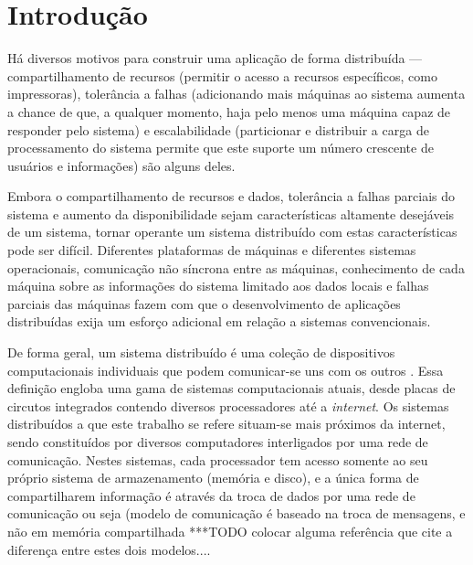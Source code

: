 \documentclass[11pt,twoside,a4paper]{book}
\begin{document}
\listoffigures
\listoftables
\listofalgorithms

\mainmatter

\fancyhead[RE,LO]{\thesection}

\singlespacing              %

\chapter{Introdução}
\label{chap:introducao}
Há diversos motivos para construir uma aplicação de forma distribuída --- compartilhamento de recursos (permitir o acesso a recursos específicos, como impressoras), tolerância a falhas (adicionando mais máquinas ao sistema aumenta a chance de que, a qualquer momento, haja pelo menos uma máquina capaz de responder pelo sistema) e escalabilidade (particionar e distribuir a carga de processamento do sistema permite que este suporte um número crescente de usuários e informações) são alguns deles.

Embora o compartilhamento de recursos e dados, tolerância a falhas parciais do sistema e aumento da disponibilidade sejam características altamente desejáveis de um sistema, tornar operante um sistema distribuído com estas características pode ser difícil. Diferentes plataformas de máquinas e diferentes sistemas operacionais, comunicação não síncrona entre as máquinas, conhecimento de cada máquina sobre as informações do sistema limitado aos dados locais e falhas parciais das máquinas fazem com que o desenvolvimento de aplicações distribuídas exija um esforço adicional em relação a sistemas convencionais.

De forma geral, um sistema distribuído é uma coleção de dispositivos computacionais individuais que podem comunicar-se uns com os outros \cite{tanenbaum, distributed_computing}. Essa definição engloba uma gama de sistemas computacionais atuais, desde placas de circutos integrados contendo diversos processadores até a \emph{internet}. Os sistemas distribuídos a que este trabalho se refere situam-se mais próximos da internet, sendo constituídos por diversos computadores interligados por uma rede de comunicação. Nestes sistemas, cada processador tem acesso somente ao seu próprio sistema de armazenamento (memória e disco), e a única forma de compartilharem informação é através da troca de dados por uma rede de comunicação ou seja (modelo de comunicação é baseado na troca de mensagens, e não em memória compartilhada ***TODO colocar alguma referência que cite a diferença entre estes dois modelos....
\end{document}

